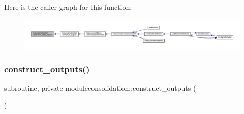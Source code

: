 Here is the caller graph for this function\+:\nopagebreak
\begin{figure}[H]
\begin{center}
\leavevmode
\includegraphics[width=350pt]{namespacemoduleconsolidation_a29241b472f688e15c435e72ca5da5273_icgraph}
\end{center}
\end{figure}
\mbox{\label{namespacemoduleconsolidation_a1c6db66f62288736bfc6a93bb76fb12c}} 
\subsubsection{\texorpdfstring{construct\+\_\+outputs()}{construct\_outputs()}}
{\footnotesize\ttfamily subroutine, private moduleconsolidation\+::construct\+\_\+outputs (\begin{DoxyParamCaption}{ }\end{DoxyParamCaption})\hspace{0.3cm}{\ttfamily [private]}}

